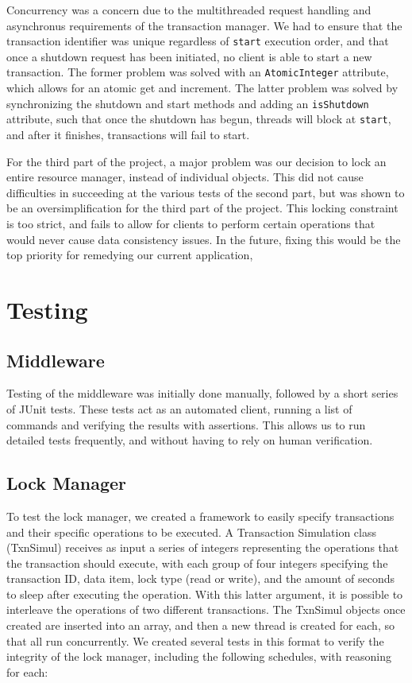 \documentclass[11pt]{article}
\begin{document}
Concurrency was a concern due to the multithreaded request handling and asynchronus requirements of the transaction manager. We had to ensure that the transaction identifier was unique regardless of \texttt{start} execution order, and that once a shutdown request has been initiated, no client is able to start a new transaction. The former problem was solved with an \texttt{AtomicInteger} attribute, which allows for an atomic get and increment. The latter problem was solved by synchronizing the shutdown and start methods and adding an \texttt{isShutdown} attribute, such that once the shutdown has begun, threads will block at \texttt{start}, and after it finishes, transactions will fail to start. \par

For the third part of the project, a major problem was our decision to lock an entire resource manager, instead of individual objects. This did not cause difficulties in succeeding at the various tests of the second part, but was shown to be an oversimplification for the third part of the project. This locking constraint is too strict, and fails to allow for clients to perform certain operations that would never cause data consistency issues. In the future, fixing this would be the top priority for remedying our current application,\par

\section*{Testing}

\subsection*{Middleware}

Testing of the middleware was initially done manually, followed by a short series of JUnit tests. These tests act as an automated client, running a list of commands and verifying the results with assertions. This allows us to run detailed tests frequently, and without having to rely on human verification.  \par

\subsection*{Lock Manager}

To test the lock manager, we created a framework to easily specify transactions and their specific operations to be executed. A Transaction Simulation class (TxnSimul) receives as input a series of integers representing the operations that the transaction should execute, with each group of four integers specifying the transaction ID, data item, lock type (read or write), and the amount of seconds to sleep after executing the operation. With this latter argument, it is possible to interleave the operations of two different transactions. The TxnSimul objects once created are inserted into an array, and then a new thread is created for each, so that all run concurrently. We created several tests in this format to verify the integrity of the lock manager, including the following schedules, with reasoning for each:
\end{document}

